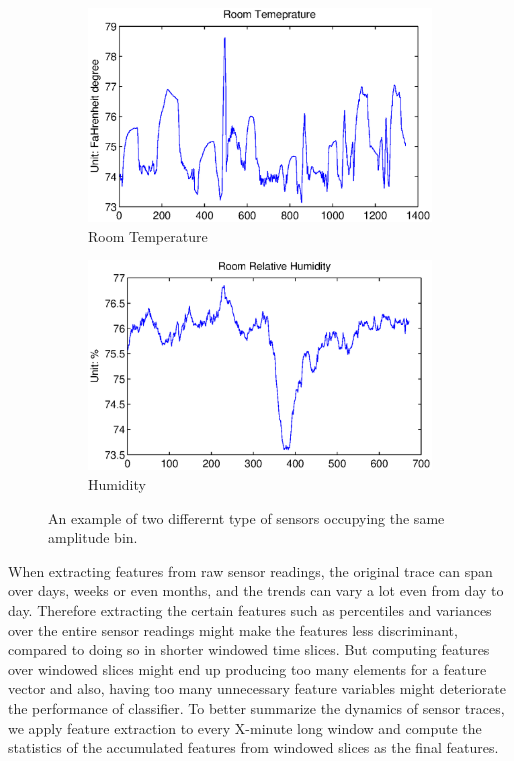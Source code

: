 \begin{figure}[ht!]
\centering
  \begin{subfigure}{0.22\textwidth}
                \centering
    \includegraphics[width=\textwidth]{./fig/rmt_ex.eps}
                \caption{Room Temperature}
  \end{subfigure}
  \begin{subfigure}{0.22\textwidth}
                \centering
    \includegraphics[width=\textwidth]{./fig/rh_ex.eps}
                \caption{Humidity}
  \end{subfigure}
\caption{An example of two differernt type of sensors occupying the same amplitude bin.}
\label{fig:same_bin}
\end{figure}

When extracting features from raw sensor readings, the original trace can span over days, weeks or even months, and
the trends can vary a lot even from day to day. Therefore extracting the certain features such as percentiles and
variances over the entire sensor readings might make the features less discriminant, compared to doing so in shorter
windowed time slices. But computing features over windowed slices might end up producing too many elements for a
feature vector and also, having too many unnecessary feature variables might deteriorate the performance of classifier.
To better summarize the dynamics of sensor traces, we apply feature extraction to every X-minute long window and compute
the statistics of the accumulated features from windowed slices as the final features. 

